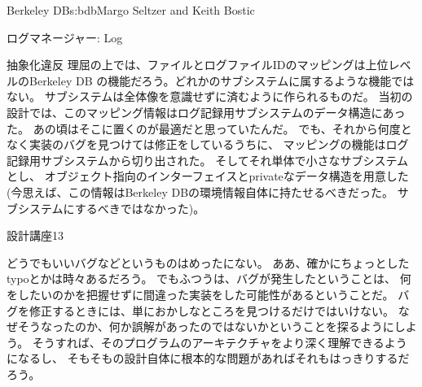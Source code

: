 \begin{aosachapter}{Berkeley DB}{s:bdb}{Margo Seltzer and Keith Bostic}
\begin{aosasect1}{ログマネージャー: Log}
\begin{aosasect2}{抽象化違反}
理屈の上では、ファイルとログファイルIDのマッピングは上位レベルのBerkeley DB
の機能だろう。どれかのサブシステムに属するような機能ではない。
サブシステムは全体像を意識せずに済むように作られるものだ。
当初の設計では、このマッピング情報はログ記録用サブシステムのデータ構造にあった。
あの頃はそこに置くのが最適だと思っていたんだ。
でも、それから何度となく実装のバグを見つけては修正をしているうちに、
マッピングの機能はログ記録用サブシステムから切り出された。
そしてそれ単体で小さなサブシステムとし、
オブジェクト指向のインターフェイスとprivateなデータ構造を用意した
(今思えば、この情報はBerkeley DBの環境情報自体に持たせるべきだった。
サブシステムにするべきではなかった)。

\begin{aosabox}{設計講座13}

どうでもいいバグなどというものはめったにない。
ああ、確かにちょっとしたtypoとかは時々あるだろう。
でもふつうは、バグが発生したということは、
何をしたいのかを把握せずに間違った実装をした可能性があるということだ。
バグを修正するときには、単におかしなところを見つけるだけではいけない。
なぜそうなったのか、何か誤解があったのではないかということを探るようにしよう。
そうすれば、そのプログラムのアーキテクチャをより深く理解できるようになるし、
そもそもの設計自体に根本的な問題があればそれもはっきりするだろう。


\end{aosabox}
\end{aosasect2}
\end{aosasect1}
\end{aosachapter}
